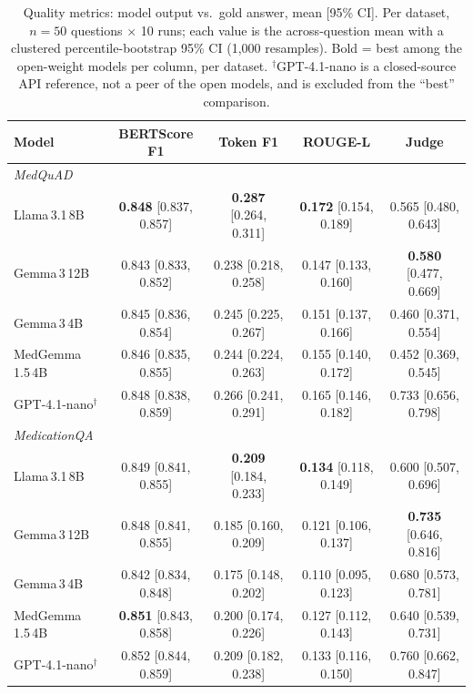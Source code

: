 \documentclass[11pt]{article}
\begin{document}
\begin{table}[h]
\centering
\caption{Quality metrics: model output vs.\ gold answer, mean [95\% CI].
Per dataset, $n{=}50$ questions $\times$ 10 runs; each value is the
across-question mean with a clustered percentile-bootstrap 95\% CI
(1{,}000 resamples). Bold = best among the open-weight models per column,
per dataset. $^\dagger$GPT-4.1-nano is a closed-source API reference, not a
peer of the open models, and is excluded from the ``best'' comparison.}
\label{tab:quality}
\footnotesize
\begin{tabular}{lcccc}
\toprule
\textbf{Model} & \textbf{BERTScore F1} & \textbf{Token F1} & \textbf{ROUGE-L} & \textbf{Judge} \\
\midrule
\multicolumn{5}{l}{\emph{MedQuAD}}\\
Llama\,3.1\,8B      & \textbf{0.848} [0.837, 0.857] & \textbf{0.287} [0.264, 0.311] & \textbf{0.172} [0.154, 0.189] & 0.565 [0.480, 0.643] \\
Gemma\,3\,12B       & 0.843 [0.833, 0.852] & 0.238 [0.218, 0.258] & 0.147 [0.133, 0.160] & \textbf{0.580} [0.477, 0.669] \\
Gemma\,3\,4B        & 0.845 [0.836, 0.854] & 0.245 [0.225, 0.267] & 0.151 [0.137, 0.166] & 0.460 [0.371, 0.554] \\
MedGemma\,1.5\,4B   & 0.846 [0.835, 0.855] & 0.244 [0.224, 0.263] & 0.155 [0.140, 0.172] & 0.452 [0.369, 0.545] \\
GPT-4.1-nano$^\dagger$ & 0.848 [0.838, 0.859] & 0.266 [0.241, 0.291] & 0.165 [0.146, 0.182] & 0.733 [0.656, 0.798] \\
\midrule
\multicolumn{5}{l}{\emph{MedicationQA}}\\
Llama\,3.1\,8B      & 0.849 [0.841, 0.855] & \textbf{0.209} [0.184, 0.233] & \textbf{0.134} [0.118, 0.149] & 0.600 [0.507, 0.696] \\
Gemma\,3\,12B       & 0.848 [0.841, 0.855] & 0.185 [0.160, 0.209] & 0.121 [0.106, 0.137] & \textbf{0.735} [0.646, 0.816] \\
Gemma\,3\,4B        & 0.842 [0.834, 0.848] & 0.175 [0.148, 0.202] & 0.110 [0.095, 0.123] & 0.680 [0.573, 0.781] \\
MedGemma\,1.5\,4B   & \textbf{0.851} [0.843, 0.858] & 0.200 [0.174, 0.226] & 0.127 [0.112, 0.143] & 0.640 [0.539, 0.731] \\
GPT-4.1-nano$^\dagger$ & 0.852 [0.844, 0.859] & 0.209 [0.182, 0.238] & 0.133 [0.116, 0.150] & 0.760 [0.662, 0.847] \\
\bottomrule
\end{tabular}
\end{table}
\end{document}
